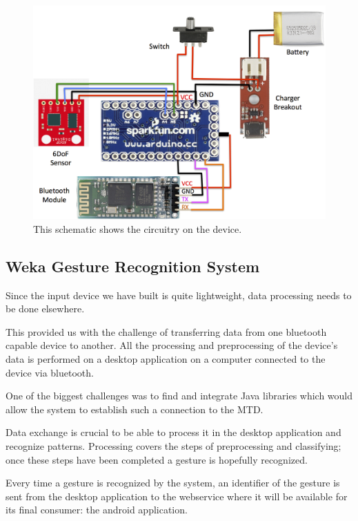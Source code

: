 \begin{figure}[!h]
\centering
\includegraphics[width=1\columnwidth]{img/device_schematic}
\caption{This schematic shows the circuitry on the device.}
\label{fig:figure1}
\end{figure}

\subsection{Weka Gesture Recognition System}
Since the input device we have built is quite lightweight, data processing needs to be done elsewhere.

This provided us with the challenge of transferring data from one bluetooth capable device to another.
All the processing and preprocessing of the device's data is performed on a desktop application on a 
computer connected to the device via bluetooth.

One of the biggest challenges was to find and integrate Java libraries which would allow the system to establish such a  
connection to the MTD.

Data exchange is crucial to be able to process it in the desktop application and recognize patterns.
Processing covers the steps of preprocessing and classifying; once these steps have been completed a gesture is hopefully recognized.


Every time a gesture is recognized by the system, an identifier of the gesture is sent from the desktop application to the webservice where it will be available for its final consumer: the android application.


